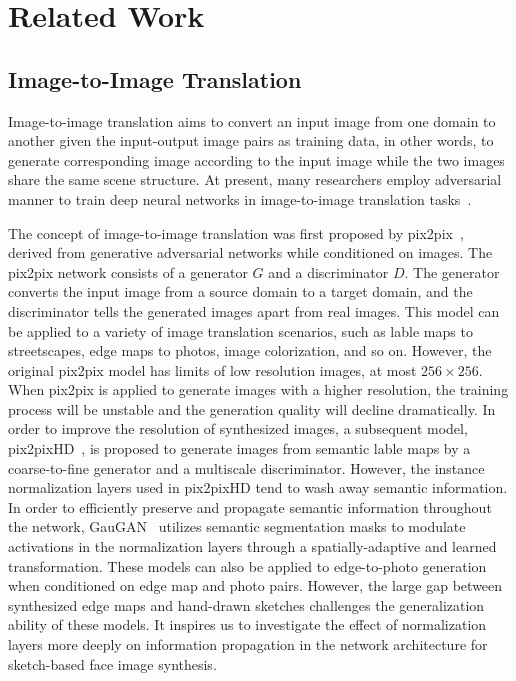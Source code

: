\documentclass[10pt,twocolumn,letterpaper]{article}
\begin{document}
\section{Related Work}
\subsection{Image-to-Image Translation}
Image-to-image translation aims to convert an input image from one domain to another given the input-output image pairs as training data, in other words, to generate corresponding image according to the input image while the two images share the same scene structure. At present, many researchers employ adversarial manner to train deep neural networks in image-to-image translation tasks~\cite{cyclegan,bicyclegan,spagan,munit,crn,cfgan,sis,cfgan,maskgan}.

The concept of image-to-image translation was first proposed by pix2pix~\cite{pix2pix}, derived from generative adversarial networks while conditioned on images. 
The pix2pix network consists of a generator $G$ and a discriminator $D$. The generator converts the input image from a source domain to a target domain, and the discriminator tells the generated images apart from real images. 
This model can be applied to a variety of image translation scenarios, such as lable maps to streetscapes, edge maps to photos, image colorization, and so on.
However, the original pix2pix model has limits of low resolution images, at most $256 \times 256$. 
When pix2pix is applied to generate images with a higher resolution, the training process will be unstable and the generation quality will decline dramatically.
In order to improve the resolution of synthesized images, a subsequent model, pix2pixHD~\cite{pix2pixhd}, is proposed to generate images from semantic lable maps by a coarse-to-fine generator and a multiscale discriminator. 
However, the instance normalization layers used in pix2pixHD tend to wash away semantic information.
In order to efficiently preserve and propagate semantic information throughout the network, GauGAN~\cite{spade} utilizes semantic segmentation masks to modulate activations in the normalization layers through a spatially-adaptive and learned transformation. 
%
These models can also be applied to edge-to-photo generation when conditioned on edge map and photo pairs. 
However, the large gap between synthesized edge maps and hand-drawn sketches challenges the generalization ability of these models.
%
It inspires us to investigate the effect of normalization layers more deeply on information propagation in the network architecture for sketch-based face image synthesis.
\end{document}
